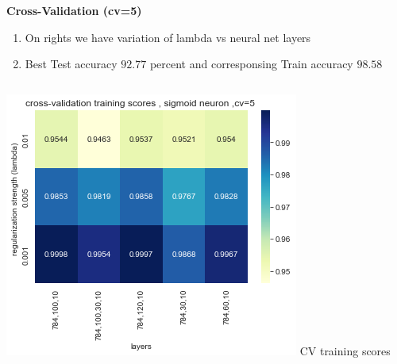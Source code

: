 \documentclass[12pt,t]{beamer}
\begin{document}
\begin{frame}[t]    
    \scriptsize

    \textbf{Cross-Validation (cv=5)}
    \begin{enumerate}
        \item On rights we have variation of lambda vs neural net layers 
        \item Best Test accuracy $92.77 $  percent and corresponsing Train accuracy $98.58$
      
    \end{enumerate}
    \begin{columns}
        \begin{column}[T]{0.4\linewidth}
            \includegraphics[width=\linewidth]{sigmoid/cv_training_score.png}
            \centering CV training scores
            

\end{column}
\end{columns}
\end{frame}
\end{document}
